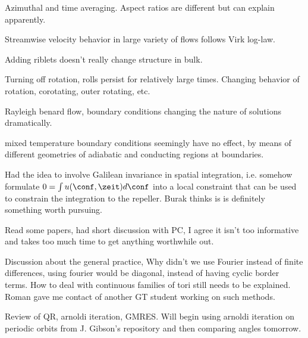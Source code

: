 \begin{description}
{\begin{description}
Azimuthal and time averaging. Aspect ratios are different
but can explain apparently.

Streamwise velocity behavior in large variety of flows follows
Virk log-law.

Adding riblets doesn't really change structure in bulk.

Turning off rotation, rolls persist for relatively large times.
Changing behavior of rotation, corotating, outer rotating, etc.

Rayleigh benard flow, boundary conditions changing the nature
of solutions dramatically.

mixed temperature boundary conditions seemingly have no effect, by
means of different geometries of adiabatic and conducting regions at
boundaries.

\item[Spatial KS]
Had the idea to involve Galilean invariance in spatial integration, i.e.
somehow formulate  $0 = \int u(\conf, \zeit) d\conf$ into a local constraint
that can be used to constrain the integration to the repeller. Burak thinks
is is definitely something worth pursuing.

\item[Shadowing Lemma]
Read some papers, had short discussion with PC, I agree it isn't too
informative and takes too much time to get anything worthwhile out.

\item[Variational methods]
Discussion about the general practice,
Why didn't we use Fourier instead of finite differences, using
fourier would be diagonal, instead of having cyclic border terms.
How to deal with continuous families of tori still needs to be
explained. Roman gave me contact of another GT student working
on such methods.

\item[Num Lin Alg]
Review of QR, arnoldi iteration, GMRES. Will begin using arnoldi
iteration on periodic orbits from J. Gibson's repository and then
comparing angles tomorrow.

\end{description}
}

\end{description}
